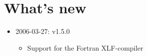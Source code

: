 
\section{What's new}

\begin{itemize}
\item{2006-03-27: v1.5.0}
   \begin{itemize}
      \item{Support for the Fortran XLF-compiler}
   \end{itemize}
\end{itemize}

